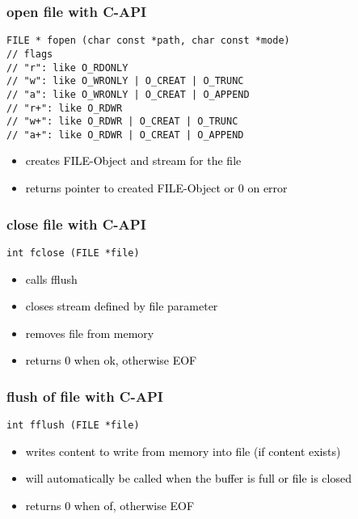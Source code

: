 \documentclass[main.tex,fontsize=8pt,paper=a4,paper=portrait,DIV=calc,]{scrartcl}
\begin{document}
\subsubsection{open file with C-API}
\begin{lstlisting}
FILE * fopen (char const *path, char const *mode)
// flags
// "r": like O_RDONLY
// "w": like O_WRONLY | O_CREAT | O_TRUNC
// "a": like O_WRONLY | O_CREAT | O_APPEND
// "r+": like O_RDWR
// "w+": like O_RDWR | O_CREAT | O_TRUNC
// "a+": like O_RDWR | O_CREAT | O_APPEND
\end{lstlisting}
\begin{itemize}
\item \textcolor{black}{creates FILE-Object and stream for the file}
\item \textcolor{black}{returns pointer to created FILE-Object or 0 on error}
\end{itemize}

\subsubsection{close file with C-API}
\begin{lstlisting}
int fclose (FILE *file)
\end{lstlisting}
\begin{itemize}
\item \textcolor{black}{calls fflush}
\item \textcolor{black}{closes stream defined by file parameter}
\item \textcolor{black}{removes file from memory}
\item \textcolor{black}{returns 0 when ok, otherwise EOF}
\end{itemize} 

\subsubsection{flush of file with C-API}
\begin{lstlisting}
int fflush (FILE *file)
\end{lstlisting}
\begin{itemize}
\item \textcolor{black}{writes content to write from memory into file (if content exists)}
\item \textcolor{black}{will automatically be called when the buffer is full or file is closed}
\item \textcolor{black}{returns 0 when of, otherwise EOF}
\end{itemize} 
\end{document}
